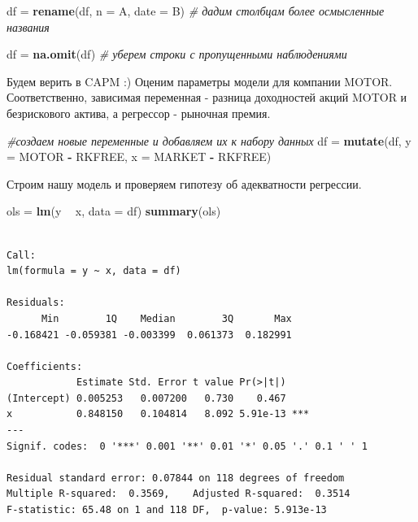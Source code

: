 \documentclass[]{book}
\newenvironment{Shaded}{\begin{snugshade}}{\end{snugshade}}
\newcommand{\CommentTok}[1]{\textcolor[rgb]{0.56,0.35,0.01}{\textit{#1}}}
\newcommand{\DataTypeTok}[1]{\textcolor[rgb]{0.13,0.29,0.53}{#1}}
\newcommand{\KeywordTok}[1]{\textcolor[rgb]{0.13,0.29,0.53}{\textbf{#1}}}
\newcommand{\NormalTok}[1]{#1}
\newcommand{\OperatorTok}[1]{\textcolor[rgb]{0.81,0.36,0.00}{\textbf{#1}}}
\newcommand{\StringTok}[1]{\textcolor[rgb]{0.31,0.60,0.02}{#1}}
\begin{document}
\begin{Shaded}
\begin{Highlighting}[]
\NormalTok{df =}\StringTok{ }\KeywordTok{rename}\NormalTok{(df, }\DataTypeTok{n =}\NormalTok{ A, }\DataTypeTok{date =}\NormalTok{ B) }\CommentTok{# дадим столбцам более осмысленные названия}
\end{Highlighting}
\end{Shaded}

\begin{Shaded}
\begin{Highlighting}[]
\NormalTok{df =}\StringTok{ }\KeywordTok{na.omit}\NormalTok{(df) }\CommentTok{# уберем строки с пропущенными наблюдениями}
\end{Highlighting}
\end{Shaded}

Будем верить в CAPM :) Оценим параметры модели для компании MOTOR. Соответственно, зависимая переменная - разница доходностей акций MOTOR и безрискового актива, а регрессор - рыночная премия.

\begin{Shaded}
\begin{Highlighting}[]
\CommentTok{#создаем новые переменные и добавляем их к набору данных}
\NormalTok{df =}\StringTok{ }\KeywordTok{mutate}\NormalTok{(df, }\DataTypeTok{y =}\NormalTok{ MOTOR }\OperatorTok{-}\StringTok{ }\NormalTok{RKFREE, }\DataTypeTok{x =}\NormalTok{ MARKET }\OperatorTok{-}\StringTok{ }\NormalTok{RKFREE) }
\end{Highlighting}
\end{Shaded}

Строим нашу модель и проверяем гипотезу об адекватности регрессии.

\begin{Shaded}
\begin{Highlighting}[]
\NormalTok{ols =}\StringTok{ }\KeywordTok{lm}\NormalTok{(y }\OperatorTok{~}\StringTok{ }\NormalTok{x, }\DataTypeTok{data =}\NormalTok{ df)}
\KeywordTok{summary}\NormalTok{(ols)}
\end{Highlighting}
\end{Shaded}

\begin{verbatim}

Call:
lm(formula = y ~ x, data = df)

Residuals:
      Min        1Q    Median        3Q       Max 
-0.168421 -0.059381 -0.003399  0.061373  0.182991 

Coefficients:
            Estimate Std. Error t value Pr(>|t|)    
(Intercept) 0.005253   0.007200   0.730    0.467    
x           0.848150   0.104814   8.092 5.91e-13 ***
---
Signif. codes:  0 '***' 0.001 '**' 0.01 '*' 0.05 '.' 0.1 ' ' 1

Residual standard error: 0.07844 on 118 degrees of freedom
Multiple R-squared:  0.3569,    Adjusted R-squared:  0.3514 
F-statistic: 65.48 on 1 and 118 DF,  p-value: 5.913e-13
\end{verbatim}
\end{document}
